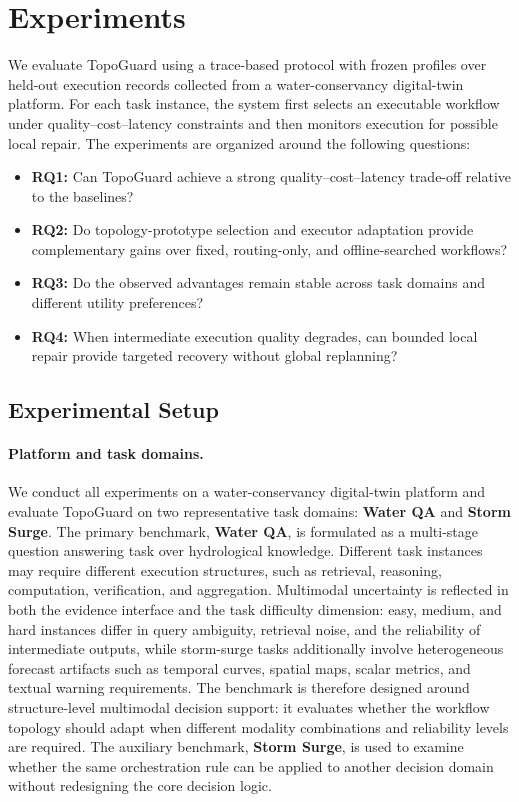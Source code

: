 \documentclass[acmsmall,review,anonymous]{acmart}
\begin{document}
\section{Experiments}
\label{sec:experiments}

We evaluate TopoGuard using a trace-based protocol with frozen profiles over held-out execution records collected from a water-conservancy digital-twin platform. 
For each task instance, the system first selects an executable workflow under quality--cost--latency constraints and then monitors execution for possible local repair. 
The experiments are organized around the following questions:

\begin{itemize}
    \item \textbf{RQ1:} Can TopoGuard achieve a strong quality--cost--latency trade-off relative to the baselines?
    \item \textbf{RQ2:} Do topology-prototype selection and executor adaptation provide complementary gains over fixed, routing-only, and offline-searched workflows?
    \item \textbf{RQ3:} Do the observed advantages remain stable across task domains and different utility preferences?
    \item \textbf{RQ4:} When intermediate execution quality degrades, can bounded local repair provide targeted recovery without global replanning?
\end{itemize}

\subsection{Experimental Setup}
\label{subsec:exp_setup}



\paragraph{Platform and task domains.}
We conduct all experiments on a water-conservancy digital-twin platform and evaluate TopoGuard on two representative task domains: \textbf{Water QA} and \textbf{Storm Surge}. 
The primary benchmark, \textbf{Water QA}, is formulated as a multi-stage question answering task over hydrological knowledge. 
Different task instances may require different execution structures, such as retrieval, reasoning, computation, verification, and aggregation. 
Multimodal uncertainty is reflected in both the evidence interface and the task difficulty dimension: easy, medium, and hard instances differ in query ambiguity, retrieval noise, and the reliability of intermediate outputs, while storm-surge tasks additionally involve heterogeneous forecast artifacts such as temporal curves, spatial maps, scalar metrics, and textual warning requirements. The benchmark is therefore designed around structure-level multimodal decision support: it evaluates whether the workflow topology should adapt when different modality combinations and reliability levels are required. The auxiliary benchmark, \textbf{Storm Surge}, is used to examine whether the same orchestration rule can be applied to another decision domain without redesigning the core decision logic.
\end{document}
